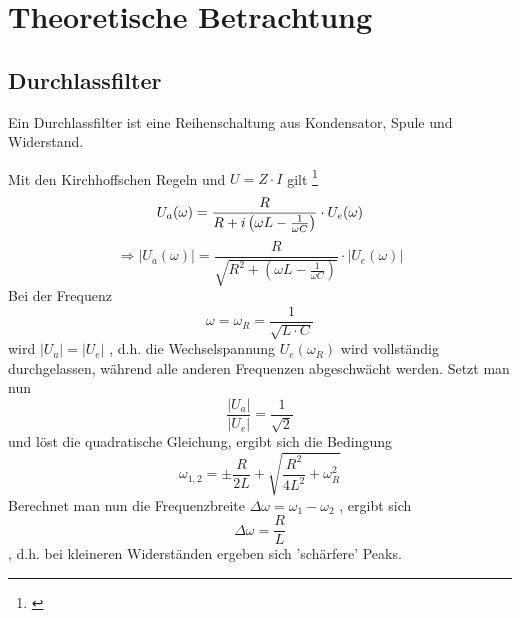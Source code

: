 \section{Theoretische Betrachtung}
\subsection{Durchlassfilter}
Ein Durchlassfilter ist eine Reihenschaltung aus Kondensator, Spule und Widerstand. 

Mit den Kirchhoffschen Regeln und 
$
U=Z\cdot I
$ 
gilt \footnote{\cite[151 ff.]{demtroder2009experimentalphysik}}
\begin{equation}
U_a(\omega)=\frac{R}{R+i\left(\omega L-\frac{1}{\omega C}\right)}\cdot U_e(\omega)\\
\end{equation}
\begin{equation}
\Rightarrow\left| U_a (\omega)\right| = \frac{R}{\sqrt{R^2+\left(\omega L - \frac{1}{\omega C}\right)}}\cdot \left| U_e(\omega) \right|
\end{equation}
Bei der Frequenz
\begin{equation}
\omega=\omega_R=\frac{1}{\sqrt{L\cdot C}}
\end{equation}
wird
$
\left|U_a \right| = \left|U_e \right|
$
, d.h. die Wechselspannung $U_e(\omega_R)$ wird vollständig durchgelassen, während alle anderen Frequenzen abgeschwächt werden.
  Setzt man nun
\begin{equation}
\frac{\left|U_a \right|}{\left|U_e \right|}=\frac{1}{\sqrt{2}}
\end{equation}
und löst die quadratische Gleichung, ergibt sich die Bedingung
\begin{equation}
\omega_{1,2}=\pm \frac{R}{2L}+\sqrt{\frac{R^2}{4L^2}+\omega_R^2}
\end{equation}
Berechnet man nun die Frequenzbreite
$
\Delta \omega=\omega_1-\omega_2
$
, ergibt sich
\begin{equation}
\Delta \omega=\frac{R}{L}
\end{equation}
, d.h. bei kleineren Widerständen ergeben sich 'schärfere' Peaks.
